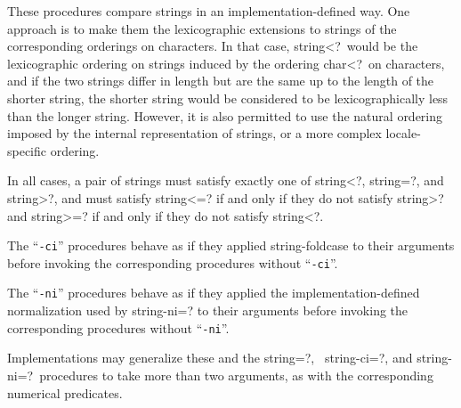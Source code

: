 \begin{entry}{%
}

These procedures compare strings in an implementation-defined way.
One approach is to make them the lexicographic extensions to strings of
the corresponding orderings on characters.  In that case, {\cf string<?}\
would be the lexicographic ordering on strings induced by the ordering
{\cf char<?}\ on characters, and if the two strings differ in length but
are the same up to the length of the shorter string, the shorter string
would be considered to be lexicographically less than the longer string.
However, it is also permitted to use the natural ordering imposed by the
internal representation of strings, or a more complex locale-specific
ordering.

In all cases, a pair of strings must satisfy exactly one of
{\cf string<?}, {\cf string=?}, and {\cf string>?}, and must satisfy
{\cf string<=?} if and only if they do not satisfy {\cf string>?} and
{\cf string>=?} if and only if they do not satisfy {\cf string<?}.

The \hbox{``{\tt -ci}''} procedures behave as if they applied
{\cf string-foldcase} to their arguments before invoking the corresponding
procedures without  \hbox{``{\tt -ci}''}.

The \hbox{``{\tt -ni}''} procedures behave as if they applied the
implementation-defined normalization used by {\cf string-ni=?}
to their arguments before
invoking the corresponding procedures without \hbox{``{\tt -ni}''}.

Implementations may generalize these and the {\cf string=?},\ {\cf
  string-ci=?}, and {\cf string-ni=?}\ procedures to take more than
two arguments, as with the corresponding numerical predicates.

\end{entry}

